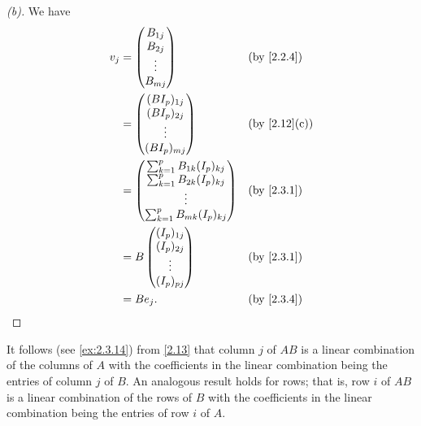 \begin{proof}[(b)]
	We have
	\begin{align*}
		v_j & = \begin{pmatrix}
			        B_{1 j} \\
			        B_{2 j} \\
			        \vdots  \\
			        B_{m j}
		        \end{pmatrix}                     &  & \by{2.2.4}   \\
		    & = \begin{pmatrix}
			        (B I_p)_{1 j} \\
			        (B I_p)_{2 j} \\
			        \vdots        \\
			        (B I_p)_{m j}
		        \end{pmatrix}                     &  & \by{2.12}[c] \\
		    & = \begin{pmatrix}
			        \sum_{k = 1}^p B_{1 k} (I_p)_{k j} \\
			        \sum_{k = 1}^p B_{2 k} (I_p)_{k j} \\
			        \vdots                             \\
			        \sum_{k = 1}^p B_{m k} (I_p)_{k j}
		        \end{pmatrix} &  & \by{2.3.1}                  \\
		    & = B \begin{pmatrix}
			          (I_p)_{1 j} \\
			          (I_p)_{2 j} \\
			          \vdots      \\
			          (I_p)_{p j}
		          \end{pmatrix}                   &  & \by{2.3.1}   \\
		    & = B e_j.                              &  & \by{2.3.4}
	\end{align*}
\end{proof}

\begin{note}
	It follows (see \cref{ex:2.3.14}) from \cref{2.13} that column \(j\) of \(AB\) is a linear combination of the columns of \(A\) with the coefficients in the linear combination being the entries of column \(j\) of \(B\).
	An analogous result holds for rows;
	that is, row \(i\) of \(AB\) is a linear combination of the rows of \(B\) with the coefficients in the linear combination being the entries of row \(i\) of \(A\).
\end{note}

